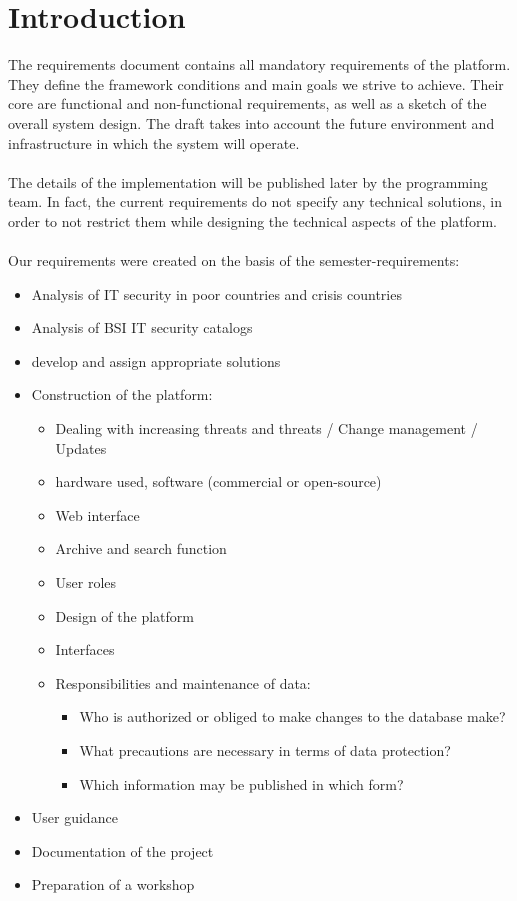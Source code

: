 \chapter{Introduction}
The requirements document contains all mandatory requirements of the platform. They define the framework conditions and main goals we strive to achieve. Their core are functional and non-functional requirements, as well as a sketch of the overall system design. The draft takes into account the future environment and infrastructure in which the system will operate. 
\\\\
The details of the implementation will be published later by the programming team. In fact, the current requirements do not specify any technical solutions, in order to not restrict them while designing the technical aspects of the platform.
\\\\

Our requirements were created on the basis of the semester-requirements:\\

\begin{itemize}
\item Analysis of IT security in poor countries and crisis countries
\item Analysis of BSI IT security catalogs
\item develop and assign appropriate solutions
\item Construction of the platform:
\begin{itemize}
\item Dealing with increasing threats and threats / Change management / Updates
\item hardware used, software (commercial or open-source)
\item Web interface
\item Archive and search function
\item User roles
\item Design of the platform
\item Interfaces
\item Responsibilities and maintenance of data:
\begin{itemize}
\item Who is authorized or obliged to make changes to the database
make?
\item What precautions are necessary in terms of data protection?
\item Which information may be published in which form?
\end{itemize}
\end{itemize}
\item User guidance
\item Documentation of the project
\item Preparation of a workshop
\end{itemize}




